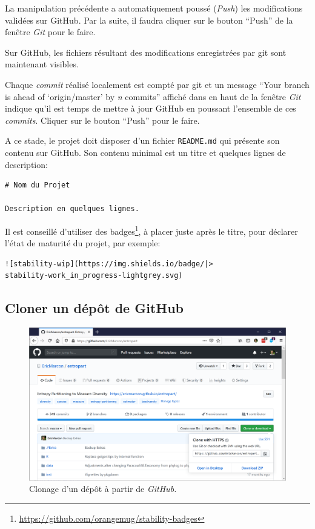 \documentclass[
  12pt,
  french,
  a4paper,
  extrafontsizes,onecolumn,openright
  ]{memoir}
\begin{document}
La manipulation précédente a automatiquement poussé (\emph{Push}) les modifications validées sur GitHub.
Par la suite, il faudra cliquer sur le bouton \enquote{Push} de la fenêtre \emph{Git} pour le faire.

Sur GitHub, les fichiers résultant des modifications enregistrées par git sont maintenant visibles.

Chaque \emph{commit} réalisé localement est compté par git et un message \enquote{Your branch is ahead of \enquote{origin/master} by \emph{n} commits} affiché dans en haut de la fenêtre \emph{Git} indique qu'il est temps de mettre à jour GitHub en poussant l'ensemble de ces \emph{commits}.
Cliquer sur le bouton \enquote{Push} pour le faire.

A ce stade, le projet doit disposer d'un fichier \texttt{README.md} qui présente son contenu sur GitHub.
Son contenu minimal est un titre et quelques lignes de description:

\begin{verbatim}
# Nom du Projet

Description en quelques lignes.
\end{verbatim}

Il est conseillé d'utiliser des badges\footnote{\url{https://github.com/orangemug/stability-badges}}, à placer juste après le titre, pour déclarer l'état de maturité du projet, par exemple:

\begin{verbatim}
![stability-wip](https://img.shields.io/badge/|>
stability-work_in_progress-lightgrey.svg)
\end{verbatim}

\hypertarget{cloner-un-duxe9puxf4t-de-github}{%
\subsection{Cloner un dépôt de GitHub}\label{cloner-un-duxe9puxf4t-de-github}}



\scriptsize

\begin{figure}

{\centering \includegraphics[width=0.8\linewidth]{images/git-Clone} 

}

\caption{Clonage d'un dépôt à partir de \emph{GitHub.}}\label{fig:git-Clone}
\end{figure}
\end{document}
